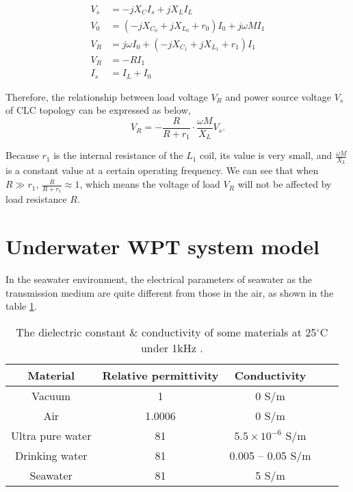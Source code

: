 \begin{equation}
    \begin{align}
        V_s & = -jX_CI_s + j X_{L}I_L                      \\
        V_0 & = (-jX_{C_0}+jX_{L_0}+r_0)I_0 + j\omega MI_1 \\
        V_R & = j\omega I_0 +(-jX_{C_1}+jX_{L_1}+r_1)I_1   \\
        V_R & = -RI_1                                      \\
        I_s & = I_L+I_0
    \end{align}
\end{equation}

Therefore, the relationship between load voltage $V_R$ and power source voltage $V_s$ of CLC topology can be expressed as below,
\begin{equation}
    V_R = - \frac{R}{R+r_1}\cdot \frac{\omega M}{X_L}V_s.
\end{equation}

Because $r_1$ is the internal resistance of the $L_1$ coil, its value is very small, and $\frac{\omega M}{X_L}$ is a constant value at a certain operating frequency. We can see that when $R \gg r_1$, $\frac{R}{R+r_1}\approx 1$, which means the voltage of load $V_R$ will not be affected by load resistance $R$.

\section{Underwater WPT system model}

In the seawater environment, the electrical parameters of seawater as the transmission medium are quite different from those in the air, as shown in the table \ref{table:permittivity}.
\begin{table}[!b]
    \centering
    \caption{The dielectric constant \& conductivity of some materials at 25$^\circ$C under 1kHz \cite{Wikipedia2020, Lenntech2021}.}
    \begin{tabular}{ |c|c|c|m{3.5cm}<{\centering}|m{3.5cm}<{\centering}| }
        \hline
        \textbf{Material} & \textbf{Relative permittivity} & \textbf{Conductivity}    \\\hline
        Vacuum            & 1                              & 0 S/m                    \\ \hline
        Air               & 1.0006                         & 0 S/m                    \\ \hline
        Ultra pure water  & 81                             & $5.5 \times 10^{-6}$ S/m \\ \hline
        Drinking water    & 81                             & 0.005 – 0.05 S/m         \\ \hline
        Seawater          & 81                             & 5 S/m                    \\ \hline
    \end{tabular}
    \label{table:permittivity}
\end{table}

